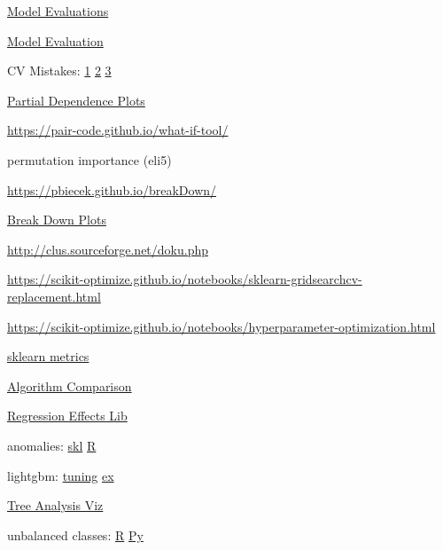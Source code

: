 \documentclass[]{book}
\begin{document}
\href{http://www.win-vector.com/blog/2016/12/be-careful-evaluating-model-predictions/}{Model Evaluations}

\href{http://blog.dato.com/how-to-evaluate-machine-learning-models-part-1-orientation}{Model Evaluation}

CV Mistakes: \href{http://betatim.github.io/posts/cross-validation-gone-wrong/}{1} \textbar{} \href{http://www.alfredo.motta.name/cross-validation-done-wrong/}{2} \textbar{} \href{http://robjhyndman.com/hyndsight/crossvalidation/}{3}

\href{https://cran.r-project.org/web/packages/pdp/pdp.pdf}{Partial Dependence Plots}

\url{https://pair-code.github.io/what-if-tool/}

permutation importance (eli5)

\url{https://pbiecek.github.io/breakDown/}

\href{https://cran.r-project.org/web/packages/breakDown/index.html}{Break Down Plots}

\url{http://clus.sourceforge.net/doku.php}

\url{https://scikit-optimize.github.io/notebooks/sklearn-gridsearchcv-replacement.html}

\url{https://scikit-optimize.github.io/notebooks/hyperparameter-optimization.html}

\href{http://scikit-learn.org/stable/modules/model_evaluation.html\#function-for-prediction-error-metrics}{sklearn metrics}

\href{https://docs.google.com/spreadsheets/d/16i47Wmjpj8k-mFRk-NnXXU5tmSQz8h37YxluDV8Zy9U/edit\#gid=0}{Algorithm Comparison}

\href{https://www.rdocumentation.org/packages/yhat/versions/2.0-0}{Regression Effects Lib}

anomalies: \href{http://scikit-learn.org/stable/modules/outlier_detection.html}{skl} \textbar{} \href{https://business-science.github.io/anomalize/}{R}

lightgbm: \href{https://medium.com/@pushkarmandot/https-medium-com-pushkarmandot-what-is-lightgbm-how-to-implement-it-how-to-fine-tune-the-parameters-60347819b7fc}{tuning} \textbar{} \href{https://www.kaggle.com/ezietsman/simple-python-lightgbm-example}{ex}

\href{http://etetoolkit.org/}{Tree Analysis Viz}

unbalanced classes: \href{https://cran.r-project.org/web/packages/imbalance/index.html}{R} \textbar{} \href{http://contrib.scikit-learn.org/imbalanced-learn/stable/}{Py}
\end{document}
